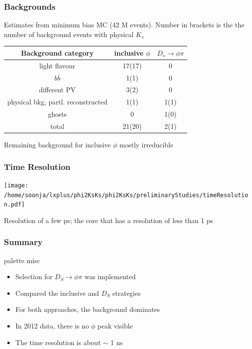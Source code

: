 \documentclass{beamer}
\begin{document}
\LogoOff
\begin{frame}[fragile]
\frametitle{Backgrounds}
Estimates from minimum bias MC (42 M events). Number in brackets is the the number of background events with physical $K_s$
\begin{center}
\begin{tabular}{c|c|c}
Background category & inclusive $\phi$ & $D_s \rightarrow \phi \pi$ \\ 
\hline 
light flavour & 17(17) & 0 \\ 
$b\overline{b}$ & 1(1) & 0 \\ 
different PV & 3(2) & 0 \\ 
physical bkg, partl. reconstructed & 1(1) & 1(1) \\ 
ghosts & 0 & 1(0) \\ 
\hline 
total & 21(20) & 2(1) \\  
\end{tabular} 
\end{center}
Remaining background for inclusive $\phi$ mostly irreducible
\end{frame}



\begin{frame}
\frametitle{Time Resolution}
\vspace*{-4mm}
\begin{center}
\texttt{[image: /home/soonja/lxplus/phi2KsKs/phi2KsKs/preliminaryStudies/timeResolution.pdf]}
\end{center}
\vspace*{-4mm}
Resolution of a few ps; the core that has a resolution of less than 1 ps
\end{frame}
\LogoOn




\LogoOff
\begin{frame}[fragile]
\frametitle{Summary}

\begin{beamercolorbox}[rounded=true,shadow=true]{palette misc}

\begin{itemize}
\item Selection for $D_S \rightarrow \phi \pi$ was implemented
\item Compared the inclusive and $D_S$ strategies
\item For both approaches, the background dominates
\item In 2012 data, there is no $\phi$ peak visible
\item The time resolution is about $\sim$ 1 ns
\end{itemize}
\end{beamercolorbox}


\end{frame}





%
\end{document}
